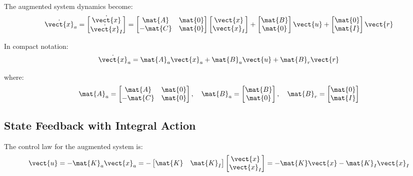 The augmented system dynamics become:
\begin{equation}
\dot{\vect{x}}_a = \begin{bmatrix} \dot{\vect{x}} \\ \dot{\vect{x}}_I \end{bmatrix} =
\begin{bmatrix} \mat{A} & \mat{0} \\ -\mat{C} & \mat{0} \end{bmatrix}
\begin{bmatrix} \vect{x} \\ \vect{x}_I \end{bmatrix} +
\begin{bmatrix} \mat{B} \\ \mat{0} \end{bmatrix} \vect{u} +
\begin{bmatrix} \mat{0} \\ \mat{I} \end{bmatrix} \vect{r}
\label{eq:augmented_integral_system}
\end{equation}

In compact notation:
\begin{equation}
\dot{\vect{x}}_a = \mat{A}_a\vect{x}_a + \mat{B}_a\vect{u} + \mat{B}_r\vect{r}
\end{equation}

where:
\begin{equation}
\mat{A}_a = \begin{bmatrix} \mat{A} & \mat{0} \\ -\mat{C} & \mat{0} \end{bmatrix}, \quad
\mat{B}_a = \begin{bmatrix} \mat{B} \\ \mat{0} \end{bmatrix}, \quad
\mat{B}_r = \begin{bmatrix} \mat{0} \\ \mat{I} \end{bmatrix}
\label{eq:augmented_matrices}
\end{equation}

\subsection{State Feedback with Integral Action}

The control law for the augmented system is:
\begin{equation}
\vect{u} = -\mat{K}_a\vect{x}_a = -\begin{bmatrix} \mat{K} & \mat{K}_I \end{bmatrix}
\begin{bmatrix} \vect{x} \\ \vect{x}_I \end{bmatrix} = -\mat{K}\vect{x} - \mat{K}_I\vect{x}_I
\label{eq:integral_control_law}
\end{equation}

